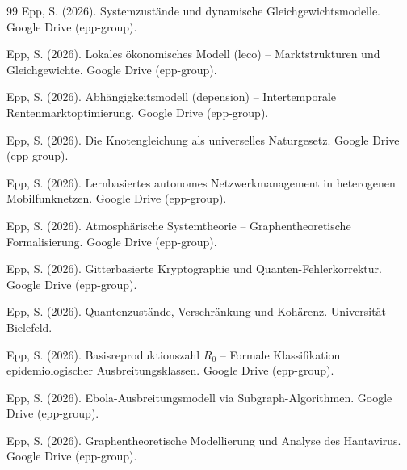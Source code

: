 ﻿\documentclass[a4paper,12pt]{article}
\theoremstyle{definition}
\begin{document}
\begin{thebibliography}{99}
Epp, S. (2026).
Systemzust\"ande und dynamische Gleichgewichtsmodelle.
Google Drive (epp-group).

Epp, S. (2026).
Lokales \"okonomisches Modell (leco) -- Marktstrukturen und Gleichgewichte.
Google Drive (epp-group).

Epp, S. (2026).
Abh\"angigkeitsmodell (depension) -- Intertemporale Rentenmarktoptimierung.
Google Drive (epp-group).

Epp, S. (2026).
Die Knotengleichung als universelles Naturgesetz.
Google Drive (epp-group).

Epp, S. (2026).
Lernbasiertes autonomes Netzwerkmanagement in heterogenen Mobilfunknetzen.
Google Drive (epp-group).

Epp, S. (2026).
Atmosph\"arische Systemtheorie -- Graphentheoretische Formalisierung.
Google Drive (epp-group).

Epp, S. (2026).
Gitterbasierte Kryptographie und Quanten-Fehlerkorrektur.
Google Drive (epp-group).

Epp, S. (2026).
Quantenzust\"ande, Verschr\"ankung und Koh\"arenz.
Universit\"at Bielefeld.

Epp, S. (2026).
Basisreproduktionszahl $R_0$ -- Formale Klassifikation epidemiologischer
Ausbreitungsklassen.
Google Drive (epp-group).

Epp, S. (2026).
Ebola-Ausbreitungsmodell via Subgraph-Algorithmen.
Google Drive (epp-group).

Epp, S. (2026).
Graphentheoretische Modellierung und Analyse des Hantavirus.
Google Drive (epp-group).

\end{thebibliography}
\end{document}
